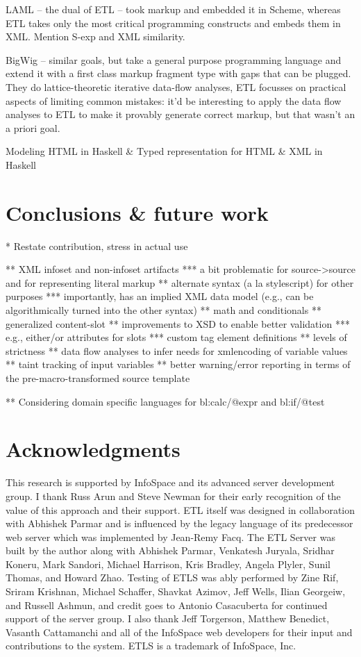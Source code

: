 \documentclass{www2003-submission}
\begin{document}
LAML -- the dual of ETL -- took markup and embedded it in Scheme,
whereas ETL takes only the most critical programming constructs and
embeds them in XML.  Mention S-exp and XML similarity.

BigWig -- similar goals, but take a general purpose programming
language and extend it with a first class markup fragment type with
gaps that can be plugged.  They do lattice-theoretic iterative
data-flow analyses, ETL focusses on practical aspects of limiting
common mistakes:  it'd be interesting to apply the data flow analyses
to ETL to make it provably generate correct markup, but that wasn't an
a priori goal.

Modeling HTML in Haskell \& Typed representation for HTML \& XML in Haskell


\section{Conclusions \& future work}
\label{sec-conclusion}

* Restate contribution, stress in actual use


** XML infoset and non-infoset artifacts
*** a bit problematic for source->source and for representing literal markup
** alternate syntax (a la stylescript) for other purposes
*** importantly, has an implied XML data model (e.g., can be algorithmically turned into the other syntax)
** math and conditionals
** generalized content-slot
** improvements to XSD to enable better validation
*** e.g., either/or attributes for slots
*** custom tag element definitions
** levels of strictness
** data flow analyses to infer needs for xmlencoding of variable values
** taint tracking of input variables
** better warning/error reporting in terms of the pre-macro-transformed source template

** Considering domain specific languages for bl:calc/@expr and bl:if/@test

\section{Acknowledgments}
\label{sec-ack}
This research is supported by InfoSpace and its advanced server
development group.  I thank Russ Arun and Steve Newman for their early
recognition of the value of this approach and their support.  ETL
itself was designed in collaboration with Abhishek Parmar and is
influenced by the legacy language of its predecessor web server which
was implemented by Jean-Remy Facq.  The ETL Server was built by the
author along with Abhishek Parmar, Venkatesh Juryala, Sridhar Koneru,
Mark Sandori, Michael Harrison, Kris Bradley, Angela Plyler, Sunil
Thomas, and Howard Zhao.  Testing of ETLS was ably performed by Zine
Rif, Sriram Krishnan, Michael Schaffer, Shavkat Azimov, Jeff Wells,
Ilian Georgeiw, and Russell Ashmun, and credit goes to Antonio
Casacuberta for continued support of the server group.  I also thank
Jeff Torgerson, Matthew Benedict, Vasanth Cattamanchi and all of the
InfoSpace web developers for their input and contributions to
the system. ETLS is a trademark of InfoSpace, Inc.




%
\end{document}
